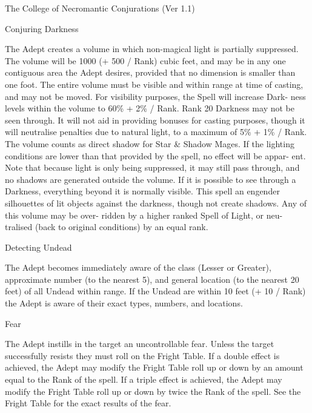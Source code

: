 \begin{Chapter}{The College of Necromantic Conjurations (Ver 1.1)}
\begin{spell}[G-3]{Conjuring Darkness}
\begin{effects}
The Adept creates a volume in which non-magical light is partially
suppressed.  The volume will be 1000 (+ 500 / Rank) cubic feet, and
may be in any one contiguous area the Adept desires, provided that no
dimension is smaller than one foot.  The entire volume must be visible
and within range at time of casting, and may not be moved.  For
visibility purposes, the Spell will increase Dark- ness levels within
the volume to 60\% + 2\% / Rank.  Rank 20 Darkness may not be seen
through. It will not aid in providing bonuses for casting purposes,
though it will neutralise penalties due to natural light, to a maximum
of 5\% + 1\% / Rank. The volume counts as direct shadow for Star \&
Shadow Mages.  If the lighting conditions are lower than that provided
by the spell, no effect will be appar- ent.  Note that because light
is only being suppressed, it may still pass through, and no shadows
are generated outside the volume. If it is possible to see through a
Darkness, everything beyond it is normally visible.  This spell an
engender silhouettes of lit objects against the darkness, though not
create shadows.  Any of this volume may be over- ridden by a higher
ranked Spell of Light, or neu- tralised (back to original conditions)
by an equal rank.
\end{effects}
\end{spell}

\begin{spell}[G-4]{Detecting Undead}
\begin{effects}
The Adept becomes immediately aware of the class (Lesser or Greater),
approximate number (to the nearest 5), and general location (to the
nearest 20 feet) of all Undead within range.  If the Undead are within
10 feet (+ 10 / Rank) the Adept is aware of their exact types,
numbers, and locations.
\end{effects}
\end{spell}

\begin{spell}[G-5]{Fear}
\begin{effects}
The Adept instills in the target an uncontrollable fear. Unless the
target successfully resists they must roll on the Fright Table.  If a
double effect is achieved, the Adept may modify the Fright Table roll
up or down by an amount equal to the Rank of the spell. If a triple
effect is achieved, the Adept may modify the Fright Table roll up or
down by twice the Rank of the spell. See the Fright Table for the
exact results of the fear.
\end{effects}
\end{spell}


\end{Chapter}
